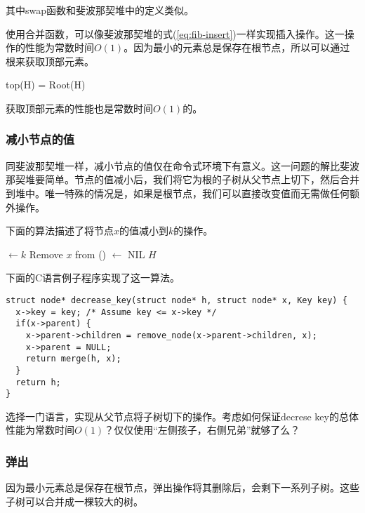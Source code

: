 \documentclass[UTF8]{article}
\begin{document}
其中swap函数和斐波那契堆中的定义类似。

使用合并函数，可以像斐波那契堆的式(\ref{eq:fib-insert})一样实现插入操作。这一操作的性能为常数时间$O(1)$。因为最小的元素总是保存在根节点，所以可以通过根来获取顶部元素。

\be
top(H) = Root(H)
\ee

获取顶部元素的性能也是常数时间$O(1)$的。

\subsubsection{减小节点的值}

同斐波那契堆一样，减小节点的值仅在命令式环境下有意义。这一问题的解比斐波那契堆要简单。节点的值减小后，我们将它为根的子树从父节点上切下，然后合并到堆中。唯一特殊的情况是，如果是根节点，我们可以直接改变值而无需做任何额外操作。

下面的算法描述了将节点$x$的值减小到$k$的操作。

\begin{algorithmic}[1]
  \State {} $\gets k$
    \State Remove $x$ from ()
     $\gets$ NIL
    \State \Return {}
  \EndIf
  \State \Return $H$
\EndFunction
\end{algorithmic}

下面的C语言例子程序实现了这一算法。

\lstset{language=C}
\begin{lstlisting}
struct node* decrease_key(struct node* h, struct node* x, Key key) {
  x->key = key; /* Assume key <= x->key */
  if(x->parent) {
    x->parent->children = remove_node(x->parent->children, x);
    x->parent = NULL;
    return merge(h, x);
  }
  return h;
}
\end{lstlisting}

\begin{Exercise}
选择一门语言，实现从父节点将子树切下的操作。考虑如何保证decrese key的总体性能为常数时间$O(1)$？仅仅使用“左侧孩子，右侧兄弟”就够了么？
\end{Exercise}

\subsubsection{弹出}
 

因为最小元素总是保存在根节点，弹出操作将其删除后，会剩下一系列子树。这些子树可以合并成一棵较大的树。
\end{document}
